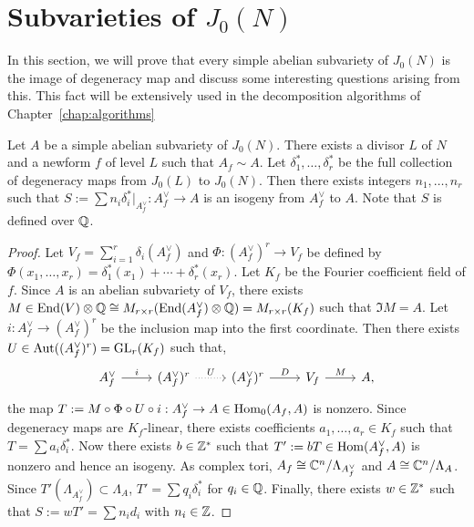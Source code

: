 \section{Subvarieties of $J_0(N)$}%
\label{sec:subvarieties_of_j_0_n_}

In this section, we will prove that every simple abelian subvariety of $J_0(N)$
is the image of degeneracy map and discuss some interesting questions arising
from this. This fact will be extensively used in the decomposition algorithms
of Chapter~\ref{chap:algorithms}

\begin{proposition}
    \label{prop:integral_degen}
    Let $A$ be a simple abelian subvariety of $J_0(N)$. There exists a divisor
    $L$ of $N$ and a newform $f$ of level $L$ such that $A_f \sim A$. Let
    $\delta_1 ^*,\ldots,\delta_r ^*$ be the full collection of degeneracy maps
    from $J_0(L)$ to $J_0(N)$. Then there exists integers $n_1,\ldots,n_r$ such
    that $S:=\sum n_i \delta_i ^*|_{A_f ^\vee}: A_f^\vee\to A$ is an isogeny
    from $A_f^\vee$ to $A$. Note that $S$ is defined over $\mathbb{Q}$.
\end{proposition}
\begin{proof}
    Let $V_f=\sum_{i=1} ^r \delta_i(A_f ^\vee)$ and $\Phi:(A_f ^\vee)^r \to
    V_f$ be defined by $\Phi(x_1,\ldots,x_r) = \delta_1 ^*(x_1)+\cdots+\delta_r
    ^*(x_r)$. Let $K_f$ be the Fourier coefficient field of $f$. Since $A$ is
    an abelian subvariety of $V_f$, there exists $M\in \operatorname{End}(V)\otimes \mathbb{Q} \cong
    M_{r\times r}(\operatorname{End}(A_f ^\vee)\otimes\mathbb{Q}) = M_{r\times r} (K_f)$ such that
    $\Im M = A$. Let $i:A_f ^\vee\to (A_f ^\vee)^r$ be the inclusion map into
    the first coordinate. Then there exists $U\in \operatorname{Aut}((A_f ^\vee)^r)=\operatorname{GL}_r
    (K_f)$ such that,
    \[
        \begin{tikzcd}
            A_f ^\vee\arrow[r,"i"] &
            (A_f ^\vee)^r \arrow[r, dotted, "U"] &
            (A_f ^\vee) ^r \arrow[r, "D"] &
            V_f \arrow[r, "M"] &
            A,
        \end{tikzcd}
    \]
    the map $T:=M \circ \Phi \circ U\circ i:A_f ^\vee\to A\in \operatorname{Hom}_0(A_f, A)$
    is nonzero. Since degeneracy maps are $K_f$-linear, there exists
    coefficients $a_1,\ldots,a_r\in K_f$ such that $T = \sum a_i \delta_i ^*$.
    Now there exists $b\in \mathbb{Z}^*$ such that $T':=bT\in \operatorname{Hom}(A_f ^\vee, A)$ is
    nonzero and hence an isogeny. As complex tori, $A_f\cong \mathbb{C}^n/\Lambda_{A_f
    ^\vee}$ and $A\cong \mathbb{C}^n/\Lambda_A$. Since $T'(\Lambda_{A_f ^\vee})\subset
    \Lambda_A$, $T'=\sum q_i \delta_i ^*$ for $q_i\in \mathbb{Q}$. Finally, there
    exists $w\in \mathbb{Z}^*$ such that $S:=wT'=\sum n_i d_i$ with $n_i\in \mathbb{Z}$.
\end{proof}

